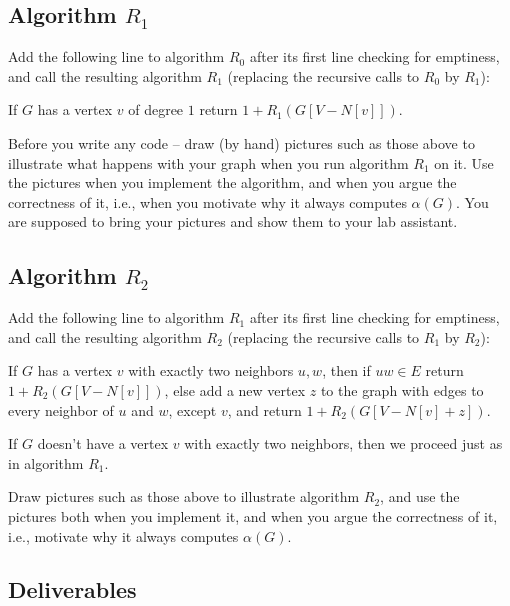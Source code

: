 \documentclass{tufte-handout}
\begin{document}
\subsection{Algorithm $R_1$}
Add the following line to algorithm $R_0$ after its first line
checking for emptiness, and call the resulting algorithm $R_1$
(replacing the recursive calls to $R_0$ by $R_1$):

If $G$ has a vertex $v$ of degree $1$ return $1+R_1(G[V-N[v]])$.

Before you write any code -- draw (by hand) pictures such as those
above to illustrate what happens with your graph when you run
algorithm $R_1$ on it. Use the pictures when you implement the
algorithm, and when you argue the correctness of it, i.e., when you
motivate why it always computes $\alpha(G)$. You are supposed to
bring your pictures and show them to your lab assistant.



\subsection{Algorithm $R_2$}
Add the following line to algorithm $R_1$ after its first line
checking for emptiness, and call the resulting algorithm $R_2$
(replacing the recursive calls to $R_1$ by $R_2$):

If $G$ has a vertex $v$ with exactly two neighbors $u,w$, then if
$uw\in E$ return $1+R_2(G[V-N[v]])$, else add a new vertex $z$ to
the graph with edges to every neighbor of $u$ and $w$, except $v$,
and return $1+R_2(G[V-N[v]+z])$.

If $G$ doesn't have a vertex $v$ with exactly two neighbors, then we
proceed just as in algorithm $R_1$.

Draw pictures such as those above to illustrate algorithm $R_2$, and
use the pictures both when you implement it, and when you argue the
correctness of it, i.e., motivate why it always computes
$\alpha(G)$.

\subsection{Deliverables}
\end{document}
